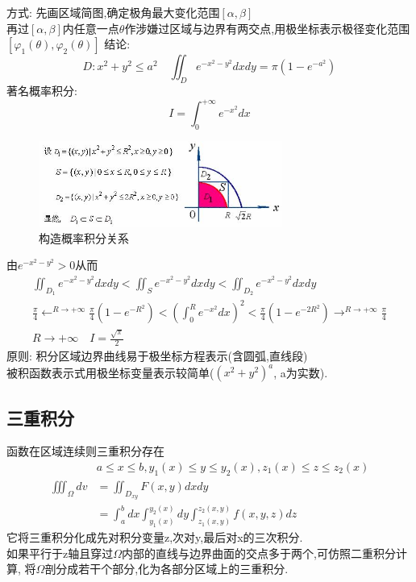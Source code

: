 \documentclass[10pt, a4paper, oneside]{ctexart}
\begin{document}
\begin{sloppypar}
	方式:
	先画区域简图,确定极角最大变化范围$[\alpha,\beta]$\\
	再过$[\alpha,\beta]$内任意一点$\theta$作涉嫌过区域与边界有两交点,用极坐标表示极径变化范围$[\varphi_1(\theta),\varphi_2(\theta)]$
	结论:
	$$
		D:x^2+y^2\leq a^2\quad
		\iint_{D}e^{-x^2-y^2}dxdy=\pi(1-e^{-a^2})
	$$
	著名概率积分:
	$$
		I=\int_{0}^{+\infty}e^{-x^2}dx
	$$
	\begin{figure}[htbp]
		\centering
		\includegraphics[width=8cm]{image293.jpg}
		\caption{构造概率积分关系}
	\end{figure}
	由$e^{-x^2-y^2}>0$从而
	\begin{gather*}
		\iint_{D_1}e^{-x^2-y^2}dxdy<\iint_{S}e^{-x^2-y^2}dxdy<\iint_{D_2}e^{-x^2-y^2}dxdy\\
		\frac{\pi}{4}\leftarrow^{R\to +\infty}\frac{\pi}{4}(1-e^{-R^2})<(\int_{0}^{R}e^{-x^2}dx)^2<\frac{\pi}{4}(1-e^{-2R^2})\rightarrow^{R\to +\infty}\frac{\pi}{4}\\
		R\to +\infty\quad I=\frac{\sqrt{\pi}}{2}
	\end{gather*}
	原则:
	积分区域边界曲线易于极坐标方程表示(含圆弧,直线段)\\
	被积函数表示式用极坐标变量表示较简单($(x^2+y^2)^a$, a为实数).
	\subsection{三重积分}
	函数在区域连续则三重积分存在
	\begin{align*}
		                  & a\leq x\leq b, y_1(x)\leq y\leq y_2(x), z_1(x)\leq z\leq z_2(x)             \\
		\iiint_{\Omega}dv & =\iint_{D_{xy}}F(x,y)dxdy                                                   \\
		                  & =\int_{a}^{b}dx\int_{y_1(x)}^{y_2(x)}dy\int_{z_1(x,y)}^{z_2(x,y)}f(x,y,z)dz
	\end{align*}
	它将三重积分化成先对积分变量z,次对y,最后对x的三次积分.\\
	如果平行于z轴且穿过$\Omega$内部的直线与边界曲面的交点多于两个,可仿照二重积分计算, 将$\Omega$剖分成若干个部分,化为各部分区域上的三重积分.

\end{sloppypar}
\end{document}
